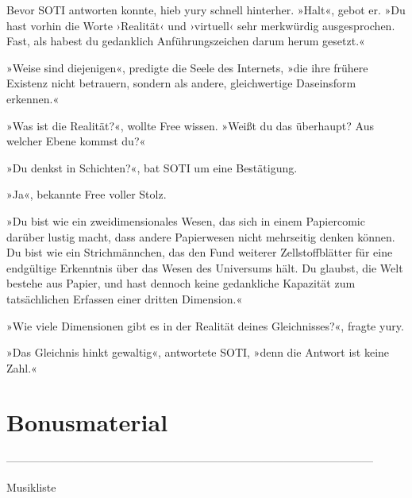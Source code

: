 Bevor SOTI antworten konnte, hieb yury schnell hinterher. »Halt«, gebot er. »Du hast vorhin die Worte ›Realität‹ und ›virtuell‹ sehr merkwürdig ausgesprochen. Fast, als habest du gedanklich Anführungszeichen darum herum gesetzt.«

»Weise sind diejenigen«, predigte die Seele des Internets, »die ihre frühere Existenz nicht betrauern, sondern als andere, gleichwertige Daseinsform erkennen.«

»Was ist die Realität?«, wollte Free wissen. »Weißt du das überhaupt? Aus welcher Ebene kommst du?«

»Du denkst in Schichten?«, bat SOTI um eine Bestätigung.

»Ja«, bekannte Free voller Stolz.

»Du bist wie ein zweidimensionales Wesen, das sich in einem Papiercomic darüber lustig macht, dass andere Papierwesen nicht mehrseitig denken können. Du bist wie ein Strichmännchen, das den Fund weiterer Zellstoffblätter für eine endgültige Erkenntnis über das Wesen des Universums hält. Du glaubst, die Welt bestehe aus Papier, und hast dennoch keine gedankliche Kapazität zum tatsächlichen Erfassen einer dritten Dimension.«

»Wie viele Dimensionen gibt es in der Realität deines Gleichnisses?«, fragte yury.

»Das Gleichnis hinkt gewaltig«, antwortete SOTI, »denn die Antwort ist keine Zahl.«








\part{Bonusmaterial}

















---------------------------------------------------------------------------------------------------

Musikliste

